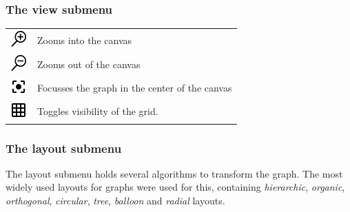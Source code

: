 \subsubsection{The view submenu}
\begin{tabular}{p{}p{}}
\includegraphics[scale=0.6]{figures/icons/zoomin.png} &  Zooms into the canvas\\
\includegraphics[scale=0.6]{figures/icons/zoomout.png}&  Zooms out of the canvas\\
\includegraphics[scale=0.6]{figures/icons/focus.png} & Focusses the graph in the center of the canvas\\
\includegraphics[scale=0.6]{figures/icons/grid.png} & Toggles visibility of the grid.
\end{tabular}
\subsubsection{The layout submenu}
The layout submenu holds several algorithms to transform the graph. The most widely used layouts for graphs were used for this, containing \textit{hierarchic}, \textit{organic}, \textit{orthogonal}, \textit{circular}, \textit{tree}, \textit{balloon} and \textit{radial} layouts.

